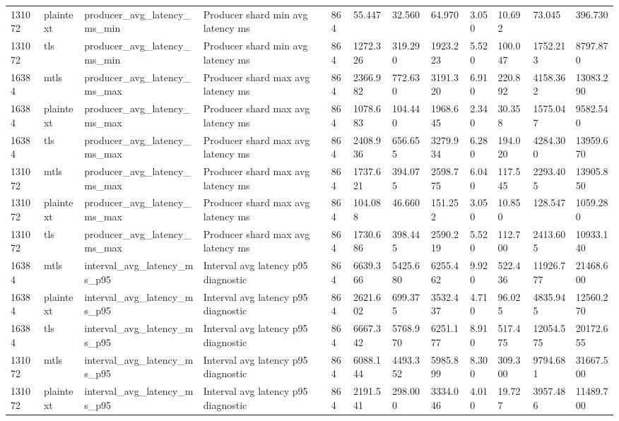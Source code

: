 \begin{longtable}{llllllllllll}
131072 & plaintext & producer\_avg\_latency\_ms\_min & Producer shard min avg latency ms & 864 & 55.447 & 32.560 & 64.970 & 3.050 & 10.692 & 73.045 & 396.730 \\
131072 & tls & producer\_avg\_latency\_ms\_min & Producer shard min avg latency ms & 864 & 1272.326 & 319.290 & 1923.223 & 5.520 & 100.047 & 1752.213 & 8797.870 \\
16384 & mtls & producer\_avg\_latency\_ms\_max & Producer shard max avg latency ms & 864 & 2366.982 & 772.630 & 3191.320 & 6.910 & 220.892 & 4158.362 & 13083.290 \\
16384 & plaintext & producer\_avg\_latency\_ms\_max & Producer shard max avg latency ms & 864 & 1078.683 & 104.440 & 1968.645 & 2.340 & 30.358 & 1575.047 & 9582.540 \\
16384 & tls & producer\_avg\_latency\_ms\_max & Producer shard max avg latency ms & 864 & 2408.936 & 656.655 & 3279.934 & 6.280 & 194.020 & 4284.300 & 13959.670 \\
131072 & mtls & producer\_avg\_latency\_ms\_max & Producer shard max avg latency ms & 864 & 1737.621 & 394.075 & 2598.775 & 6.040 & 117.545 & 2293.405 & 13905.850 \\
131072 & plaintext & producer\_avg\_latency\_ms\_max & Producer shard max avg latency ms & 864 & 104.088 & 46.660 & 151.252 & 3.050 & 10.850 & 128.547 & 1059.280 \\
131072 & tls & producer\_avg\_latency\_ms\_max & Producer shard max avg latency ms & 864 & 1730.686 & 398.445 & 2590.219 & 5.520 & 112.700 & 2413.605 & 10933.140 \\
16384 & mtls & interval\_avg\_latency\_ms\_p95 & Interval avg latency p95 diagnostic & 864 & 6639.366 & 5425.680 & 6255.462 & 9.920 & 522.436 & 11926.777 & 21468.600 \\
16384 & plaintext & interval\_avg\_latency\_ms\_p95 & Interval avg latency p95 diagnostic & 864 & 2621.602 & 699.375 & 3532.437 & 4.710 & 96.025 & 4835.945 & 12560.270 \\
16384 & tls & interval\_avg\_latency\_ms\_p95 & Interval avg latency p95 diagnostic & 864 & 6667.342 & 5768.970 & 6251.177 & 8.910 & 517.475 & 12054.575 & 20172.655 \\
131072 & mtls & interval\_avg\_latency\_ms\_p95 & Interval avg latency p95 diagnostic & 864 & 6088.144 & 4493.352 & 5985.899 & 8.300 & 309.300 & 9794.681 & 31667.500 \\
131072 & plaintext & interval\_avg\_latency\_ms\_p95 & Interval avg latency p95 diagnostic & 864 & 2191.541 & 298.000 & 3334.046 & 4.010 & 19.727 & 3957.486 & 11489.700 \\

\end{longtable}
